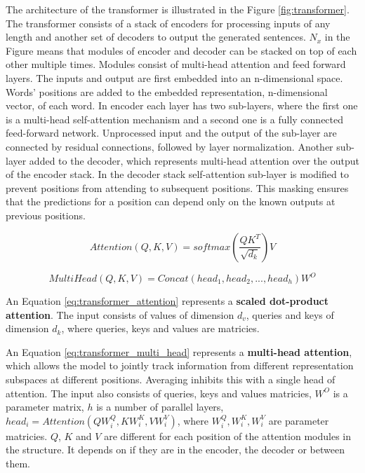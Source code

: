 The architecture of the transformer is illustrated in the Figure \ref{fig:transformer}. The transformer consists of a stack of encoders for processing inputs of any length and another set of decoders to output the generated sentences. $N_x$ in the Figure means that modules of encoder and decoder can be stacked on top of each other multiple times. Modules consist of multi-head attention and feed forward layers. The inputs and output are first embedded into an n-dimensional space. Words' positions are added to the embedded representation, n-dimensional vector, of each word. In encoder each layer has two sub-layers, where the first one is a multi-head self-attention mechanism and a second one is a fully connected feed-forward network. Unprocessed input and the output of the sub-layer are connected by residual connections, followed by layer normalization. Another sub-layer added to the decoder, which represents multi-head attention over the output of the encoder stack. In the decoder stack self-attention sub-layer is modified to prevent positions from attending to subsequent positions. This masking ensures that the predictions for a position can depend only on the known outputs at previous positions.


\begin{equation} \label{eq:transformer_attention}
Attention(Q, K, V) = softmax(\frac{QK^T}{\sqrt{d_k}})V
\end{equation}

\begin{equation} \label{eq:transformer_multi_head}
MultiHead(Q, K, V) = Concat(head_1, head_2, ..., head_h)W^O
\end{equation}

An Equation \ref{eq:transformer_attention} represents a \textbf{scaled dot-product attention}. The input consists of values of dimension $d_v$, queries and keys of dimension $d_k$, where queries, keys and values are matricies.

An Equation \ref{eq:transformer_multi_head} represents a \textbf{multi-head attention}, which allows the model to jointly track information from different representation subspaces at different positions. Averaging inhibits this with a single head of attention. The input also consists of queries, keys and values matricies, $W^O$ is a parameter matrix, $h$ is a number of parallel layers, $head_i = Attention(QW_i^Q, KW_i^K, VW_i^V)$, where $W_i^Q, W_i^K, W_i^V$ are parameter matricies. $Q$, $K$ and $V$ are different for each position of the attention modules in the structure. It depends on if they are in the encoder, the decoder or between them.

